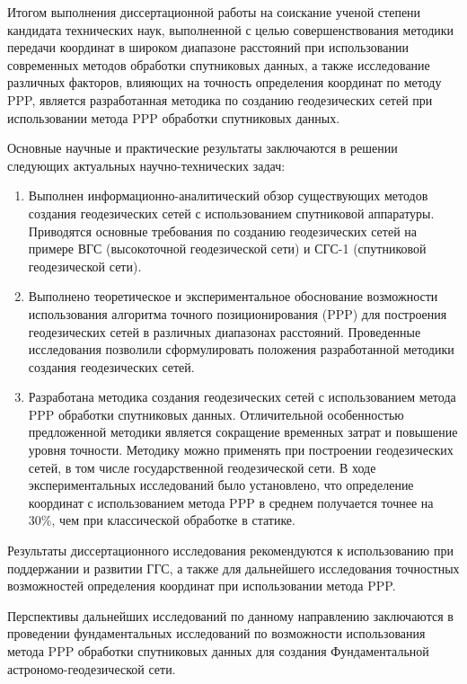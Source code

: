 Итогом выполнения диссертационной работы на соискание ученой степени кандидата технических наук, выполненной с целью совершенствования методики передачи координат в широком диапазоне расстояний при использовании современных методов обработки спутниковых данных, а также исследование различных факторов, влияющих на точность определения координат по методу PPP, является разработанная методика по созданию геодезических сетей при использовании метода PPP обработки спутниковых данных.

Основные научные и практические результаты заключаются в решении следующих актуальных научно-технических задач:

\begin{enumerate}
	\item Выполнен информационно-аналитический обзор существующих методов создания геодезических сетей с использованием спутниковой аппаратуры. Приводятся основные требования по созданию геодезических сетей на примере ВГС (высокоточной геодезической сети) и СГС-1 (спутниковой геодезической сети).
	\item Выполнено теоретическое и экспериментальное обоснование возможности использования алгоритма точного позиционирования (PPP) для построения геодезических сетей в различных диапазонах расстояний. Проведенные исследования позволили сформулировать положения разработанной методики создания геодезических сетей.
	\item Разработана методика создания геодезических сетей с использованием метода PPP обработки спутниковых данных. Отличительной особенностью предложенной методики является сокращение временных затрат и повышение уровня точности. Методику можно применять при построении геодезических сетей, в том числе государственной геодезической сети. В ходе экспериментальных исследований было установлено, что определение координат с использованием метода PPP в среднем получается точнее на 30\%, чем при классической обработке в статике.
\end{enumerate}

Результаты диссертационного исследования рекомендуются к использованию при поддержании и развитии ГГС, а также для дальнейшего исследования точностных возможностей определения координат при использовании метода PPP.

Перспективы дальнейших исследований по данному направлению заключаются в проведении фундаментальных исследований по возможности использования метода PPP обработки спутниковых данных для создания Фундаментальной астрономо-геодезической сети.



